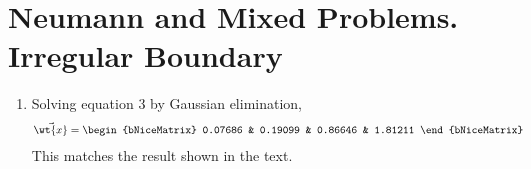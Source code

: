 \section{Neumann and Mixed Problems. Irregular Boundary}

\begin{enumerate}
    \item Solving equation $ 3 $ by Gaussian elimination,
          \begin{align}
              \vec{\wt{x}} & = \begin{bNiceMatrix}
                                   0.07686 & 0.19099 & 0.86646 & 1.81211
                               \end{bNiceMatrix}
          \end{align}
          This matches the result shown in the text.


\end{enumerate}
